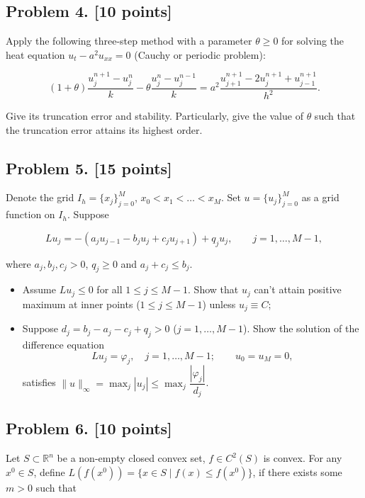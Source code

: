 \documentclass[11pt,a4paper]{article}
\begin{document}
\subsection{Problem 4. [10 points]}
Apply the following three-step method with a parameter \(\theta \geqslant 0\) for solving the heat equation \(u_{t} - a^{2} u_{xx} = 0\) (Cauchy or periodic problem):

\[
(1 + \theta) \frac{u_{j}^{n+1} - u_{j}^{n}}{k} - \theta \frac{u_{j}^{n} - u_{j}^{n-1}}{k} = a^{2} \frac{u_{j+1}^{n+1} - 2u_{j}^{n+1} + u_{j-1}^{n+1}}{h^{2}}.
\]

Give its truncation error and stability. Particularly, give the value of \(\theta\) such that the truncation error attains its highest order.

\subsection{Problem 5. [15 points]}
Denote the grid \(I_{h} = \{x_{j}\}_{j=0}^{M}\), \(x_{0} < x_{1} < \dots < x_{M}\). Set \(u = \{u_{j}\}_{j=0}^{M}\) as a grid function on \(I_{h}\). Suppose

\[
L u_{j} = -(a_{j} u_{j-1} - b_{j} u_{j} + c_{j} u_{j+1}) + q_{j} u_{j}, \qquad j = 1, \dots, M-1,
\]

where \(a_{j}, b_{j}, c_{j} > 0\), \(q_{j} \geqslant 0\) and \(a_{j} + c_{j} \leqslant b_{j}\).
\begin{itemize}
    \item Assume \(L u_{j} \leqslant 0\) for all \(1 \leqslant j \leqslant M-1\). Show that \(u_{j}\) can't attain positive maximum at inner points (\(1 \leqslant j \leqslant M-1\)) unless \(u_{j} \equiv C\);
    \item Suppose \(d_{j} = b_{j} - a_{j} - c_{j} + q_{j} > 0\) (\(j = 1, \dots, M-1\)). Show the solution of the difference equation
    \[
    L u_{j} = \varphi_{j}, \quad j = 1, \dots, M-1; \qquad u_{0} = u_{M} = 0,
    \]
    satisfies \(\|u\|_{\infty} = \max_{j} |u_{j}| \leqslant \max_{j} \dfrac{|\varphi_{j}|}{d_{j}}\).
\end{itemize}

\subsection{Problem 6. [10 points]}
Let \(S \subset \mathbb{R}^{n}\) be a non-empty closed convex set, \(f \in C^{2}(S)\) is convex. For any \(x^{0} \in S\), define \(L(f(x^{0})) = \{x \in S \mid f(x) \le f(x^{0})\}\), if there exists some \(m > 0\) such that
\end{document}
